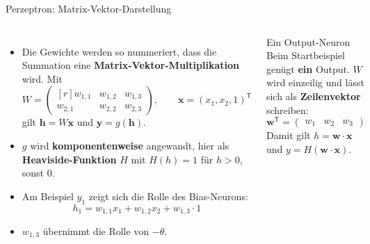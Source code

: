 \begin{frame}{Perzeptron: Matrix-Vektor-Darstellung}
\footnotesize
\begin{columns}
\begin{itemize}
  \item Die Gewichte werden so nummeriert, dass die Summation eine
        \textbf{Matrix-Vektor-Multiplikation} wird. Mit
        \[
          W = \begin{pmatrix*}[r]
            w_{1,1} & w_{1,2} & w_{1,3}\\
            w_{2,1} & w_{2,2} & w_{2,3}
          \end{pmatrix*},
          \qquad
          \mathbf{x} = (x_1, x_2, 1)^{\mathsf{T}}
        \]
        gilt $\mathbf{h} = W\mathbf{x}$ und
        $\mathbf{y} = g(\mathbf{h})$.
  \item $g$ wird \textbf{komponentenweise} angewandt, hier als
        \textbf{Heaviside-Funktion} $H$ mit $H(h) = 1$ für $h > 0$, sonst $0$.
  \item Am Beispiel $y_1$ zeigt sich die Rolle des Bias-Neurons:
        \[
          h_1 = w_{1,1} x_1 + w_{1,2} x_2 + w_{1,3}\cdot 1
        \]
  \item $w_{1,3}$ übernimmt die Rolle von $-\theta$.
\end{itemize}

\begin{blockC1}{\footnotesize Ein Output-Neuron}
Beim Startbeispiel genügt \textbf{ein} Output. $W$ wird einzeilig und lässt
sich als \textbf{Zeilenvektor} schreiben:
\[
  \mathbf{w}^{\mathsf{T}} = \begin{pmatrix} w_1 & w_2 & w_3 \end{pmatrix}
\]
Damit gilt $h = \mathbf{w}\cdot\mathbf{x}$ und $y = H(\mathbf{w}\cdot\mathbf{x})$.
\end{blockC1}
\end{columns}
\end{frame}

